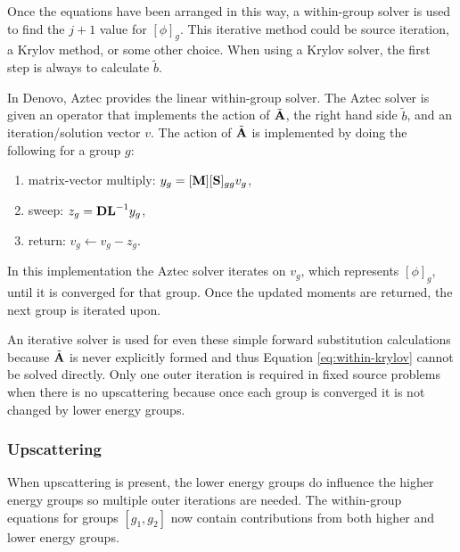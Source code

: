 Once the equations have been arranged in this way, a within-group solver is used to find the $j+1$ value for $[\phi]_{g}$. This iterative method could be source iteration, a Krylov method, or some other choice. When using a Krylov solver, the first step is always to calculate $\tilde{b}$. 

In Denovo, Aztec \cite{Heroux2007} provides the linear within-group solver. The Aztec solver is given an operator that implements the action of $\tilde{\mathbf{A}}$, the right hand side $\tilde{b}$, and an iteration/solution vector $v$. The action of $\tilde{\mathbf{A}}$ is implemented by doing the following for a group $g$:
\begin{enumerate}
  \item matrix-vector multiply: $y_{g} = [\mathbf{M}][\mathbf{S}]_{gg} v_{g}$,
  \item sweep: $z_{g} = \mathbf{DL}^{-1} y_{g}$,
  \item return: $v_{g} \leftarrow v_{g} - z_{g}$.
\end{enumerate}
In this implementation the Aztec solver iterates on $v_{g}$, which represents $[\phi]_{g}$, until it is converged for that group. Once the updated moments are returned, the next group is iterated upon. 

An iterative solver is used for even these simple forward substitution calculations because $\tilde{\mathbf{A}}$ is never explicitly formed and thus Equation \eqref{eq:within-krylov} cannot be solved directly. Only one outer iteration is required in fixed source problems when there is no upscattering because once each group is converged it is not changed by lower energy groups. 


\subsubsection{Upscattering}
When upscattering is present, the lower energy groups do influence the higher energy groups so multiple outer iterations are needed. The within-group equations for groups $[g_{1}, g_{2}]$ now contain contributions from both higher and lower energy groups. 

